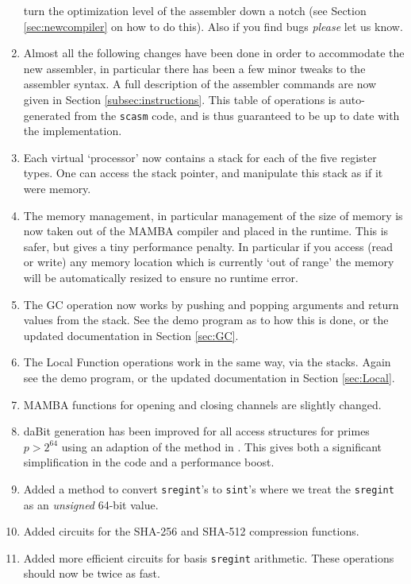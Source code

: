\begin{enumerate}
  turn the optimization level of the assembler down a notch
  (see Section \ref{sec:newcompiler} on how to do this). 
  Also if you find bugs {\em please} let us know. 
  \item Almost all the following changes have been done in order
  to accommodate the new assembler, in particular there has been
  a few minor tweaks to the assembler syntax.
  A full description of the assembler commands are now
  given in Section \ref{subsec:instructions}. This table of operations is auto-generated
  from the \verb+scasm+ code, and is thus guaranteed to be up to date with the implementation.
  \item Each virtual `processor' now contains a stack for each
  of the five register types. One can access the stack pointer,
  and manipulate this stack as if it were memory.
  \item The memory management, in particular management of the
  size of memory is now taken out of the MAMBA compiler and
  placed in the runtime. This is safer, but gives a tiny
  performance penalty. In particular if you access (read or write)
  any memory location which is currently `out of range' the
  memory will be automatically resized to ensure no runtime
  error.
  \item The GC operation now works by pushing and popping
  arguments and return values from the stack. See the demo
  program as to how this is done, or the updated documentation
  in Section \ref{sec:GC}.
  \item The Local Function operations work in the same way, via
  the stacks. Again see the demo program, or the updated
  documentation in Section \ref{sec:Local}.
  \item MAMBA functions for opening and closing channels are slightly
  changed.
  \item daBit generation has been improved for all access structures
  for primes $p>2^{64}$ using an adaption of the method in \cite{SPDZKG}.
  This gives both a significant simplification in the code and
  a performance boost.
  \item Added a method to convert \verb|sregint|'s to \verb|sint|'s
  where we treat the \verb|sregint| as an {\em unsigned} 64-bit value.
  \item Added circuits for the SHA-256 and SHA-512 compression functions.
  \item Added more efficient circuits for basis \verb|sregint| arithmetic.
  These operations should now be twice as fast.
 \end{enumerate}

